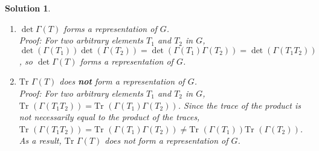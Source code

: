 \documentclass[UTF8,10pt,a4paper]{article}
\theoremstyle{Problem}
\theoremstyle{Solution}
\newtheorem*{sol}{Solution}
\newcommand{\Tr}{\text{Tr }}
\begin{document}
\begin{sol}
\begin{enumerate}
        \item[(f)] $\det\Gamma(T)$ forms a representation of $G$.\\
        Proof:
        For two arbitrary elements $T_1$ and $T_2$ in $G$, $\det(\Gamma(T_1))\det(\Gamma(T_2))=\det(\Gamma(T_1)\Gamma(T_2))=\det(\Gamma(T_1T_2))$, so $\det\Gamma(T)$ forms a representation of $G$.
        \item[(g)] $\Tr\Gamma(T)$ does \textbf{not} form a representation of $G$.\\
        Proof:
        For two arbitrary elements $T_1$ and $T_2$ in $G$, $\Tr(\Gamma(T_1T_2))=\Tr(\Gamma(T_1)\Gamma(T_2))$. Since the trace of the product is not necessarily equal to the product of the traces, $\Tr(\Gamma(T_1T_2))=\Tr(\Gamma(T_1)\Gamma(T_2))\neq\Tr(\Gamma(T_1))\Tr(\Gamma(T_2))$. As a result, $\Tr\Gamma(T)$ does not form a representation of $G$.
    \end{enumerate}
\end{sol}
\end{document}
